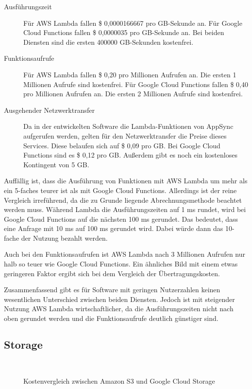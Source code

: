 \begin{description}
  \item[Ausführungszeit] Für AWS Lambda fallen \$ 0,0000166667 pro GB-Sekunde an. Für Google Cloud Functions fallen \$ 0,0000035 pro GB-Sekunde an. Bei beiden Diensten sind die ersten 400000 GB-Sekunden kostenfrei.
  \item[Funktionsaufrufe] Für AWS Lambda fallen \$ 0,20 pro Millionen Aufrufen an. Die ersten 1 Millionen Aufrufe sind kostenfrei. Für Google Cloud Functions fallen \$ 0,40 pro Millionen Aufrufen an. Die ersten 2 Millionen Aufrufe sind kostenfrei.
  \item[Ausgehender Netzwerktransfer] Da in der entwickelten Software die Lambda-Funktionen von AppSync aufgerufen werden, gelten für den Netzwerktransfer die Preise dieses Services. Diese belaufen sich auf \$ 0,09 pro GB. Bei Google Cloud Functions sind es \$ 0,12 pro GB. Außerdem gibt es noch ein kostenloses Kontingent von 5 GB.
\end{description}

Auffällig ist, dass die Ausführung von Funktionen mit \ac{AWS} Lambda um mehr als ein 5-faches teurer ist als mit Google Cloud Functions. Allerdings ist der reine Vergleich irreführend, da die zu Grunde liegende Abrechnungsmethode beachtet werden muss. Während Lambda die Ausführungszeiten auf 1 ms rundet, wird bei Google Cloud Functions auf die nächsten 100 ms gerundet. Das bedeutet, dass eine Anfrage mit 10 ms auf 100 ms gerundet wird. Dabei würde dann das 10-fache der Nutzung bezahlt werden.

Auch bei den Funktionsaufrufen ist \ac{AWS} Lambda nach 3 Millionen Aufrufen nur halb so teuer wie Google Cloud Functions. Ein ähnliches Bild mit einem etwas geringeren Faktor ergibt sich bei dem Vergleich der Übertragungskosten.

Zusammenfassend gibt es für Software mit geringen Nutzerzahlen keinen wesentlichen Unterschied zwischen beiden Diensten. Jedoch ist mit steigender Nutzung \ac{AWS} Lambda wirtschaftlicher, da die Ausführungszeiten nicht nach oben gerundet werden und die Funktionsaufrufe deutlich günstiger sind.

\subsection{Storage}

\begin{figure}
  \centering
  \quad
  \\
  \quad
  \caption{Kostenvergleich zwischen Amazon S3 und Google Cloud Storage}
  \label{kostenvergleichStorage}
\end{figure}


